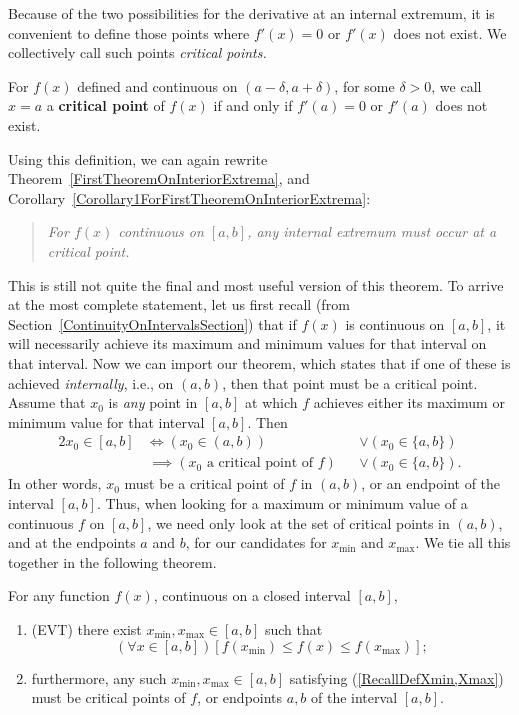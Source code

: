 Because of the two possibilities for the derivative at an internal
extremum, it is convenient to define those points where $f'(x)=0$
or $f'(x)$ does not exist.  We collectively call such points
{\it critical points.}
\begin{definition}
For $f(x)$ defined and continuous on $(a-\delta,a+\delta)$,
for some $\delta>0$, we call $x=a$ a
{\bf critical point} of $f(x)$ if and only if 
$f'(a)=0$ or $f'(a)$ does not exist.
\end{definition}
Using this definition, we can again rewrite 
Theorem~\ref{FirstTheoremOnInteriorExtrema}, and
Corollary~\ref{Corollary1ForFirstTheoremOnInteriorExtrema}:
\begin{quote}
{\it For $f(x)$ continuous on $[a,b]$, any internal extremum
must occur at a critical point.}
\end{quote}
This is still not quite the final and most useful version of this theorem.
To arrive at the most complete statement, let us first recall 
(from Section~\ref{ContinuityOnIntervalsSection})
that if $f(x)$ is continuous on $[a,b]$, it will necessarily achieve its 
maximum and minimum values for that interval on that interval.
Now we can import our theorem, which states that if one of these
is achieved {\it internally}, i.e., on $(a,b)$, then that
point must be a critical point. Assume that $x_0$ is 
{\it any} point in $[a,b]$ at which $f$ achieves either its maximum
or minimum value for that interval $[a,b]$. Then
\begin{alignat*}{2}
x_0\in[a,b]&\iff(x_0\in(a,b))&&\vee(x_0\in\{a,b\})\\
           &\,\implies(x_0\text{ a critical point of }f)&&\vee(x_0\in\{a,b\}).
\end{alignat*}
In other words, $x_0$ must be a critical point of $f$ in $(a,b)$, or
an endpoint of the interval $[a,b]$.  Thus, when looking for 
a maximum or minimum value of a continuous $f$ on $[a,b]$, we
need only look at the set of critical points in $(a,b)$, and
at the endpoints $a$ and $b$, for our candidates for $x_{\text{min}}$
and $x_{\text{max}}$.  We tie all this together in the following theorem.
\begin{theorem}
For any function $f(x)$, continuous on a closed interval $[a,b]$, 
\begin{enumerate}
\item (EVT) there exist $x_{\text{min}},x_{\text{max}}\in[a,b]$ such that
  \begin{equation}
 (\forall x\in[a,b])[f(x_{\text{min}})\le f(x)\le f(x_{\text{max}})];
    \label{RecallDefXmin,Xmax}\end{equation}
\item furthermore, any such $x_{\text{min}},x_{\text{max}}\in[a,b]$
    satisfying {\rm (\ref{RecallDefXmin,Xmax})} must be critical points
    of $f$, or endpoints $a,b$ of the interval $[a,b]$.
\end{enumerate}
\label{HowToFindXmax,XminOn[a,b]}\end{theorem}



